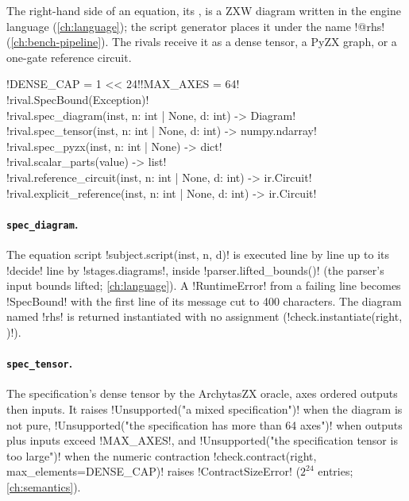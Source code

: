 The right-hand side of an equation, its , is a ZXW diagram written in the engine language (\cref{ch:language}); the script generator places it under the name \azx!@rhs! (\cref{ch:bench-pipeline}). The rivals receive it as a dense tensor, a PyZX graph, or a one-gate reference circuit.

\begin{signature}
\py!DENSE_CAP = 1 << 24!\quad\py!MAX_AXES = 64!\\
\py!rival.SpecBound(Exception)!\\
\py!rival.spec_diagram(inst, n: int | None, d: int) -> Diagram!\\
\py!rival.spec_tensor(inst, n: int | None, d: int) -> numpy.ndarray!\\
\py!rival.spec_pyzx(inst, n: int | None) -> dict!\\
\py!rival.scalar_parts(value) -> list!\\
\py!rival.reference_circuit(inst, n: int | None, d: int) -> ir.Circuit!\\
\py!rival.explicit_reference(inst, n: int | None, d: int) -> ir.Circuit!
\end{signature}

\paragraph{\texttt{spec\_diagram}.} The equation script \py!subject.script(inst, n, d)! is executed line by line up to its \azx!decide! line by \py!stages.diagrams!, inside \py!parser.lifted_bounds()! (the parser's input bounds lifted; \cref{ch:language}). A \py!RuntimeError! from a failing line becomes \py!SpecBound! with the first line of its message cut to 400 characters. The diagram named \code!rhs! is returned instantiated with no assignment (\py!check.instantiate(right, {})!).

\paragraph{\texttt{spec\_tensor}.} The specification's dense tensor by the ArchytasZX oracle, axes ordered outputs then inputs. It raises \py!Unsupported("a mixed specification")! when the diagram is not pure, \py!Unsupported("the specification has more than 64 axes")! when outputs plus inputs exceed \py!MAX_AXES!, and \py!Unsupported("the specification tensor is too large")! when the numeric contraction \py!check.contract(right, max_elements=DENSE_CAP)! raises \py!ContractSizeError! ($2^{24}$ entries; \cref{ch:semantics}).

